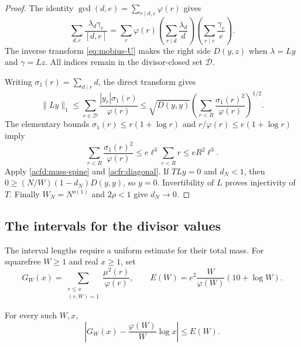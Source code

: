 \begin{proof}
The identity $\gcd(d,e)=\sum_{r\mid d,e}\varphi(r)$ gives
\[
 \sum_{d,e}\frac{\lambda_d\gamma_e}{[d,e]}
 =\sum_r\varphi(r)
       \left(\sum_{r\mid d}\frac{\lambda_d}{d}\right)
       \left(\sum_{r\mid e}\frac{\gamma_e}{e}\right).
\]
The inverse transform \eqref{eq:mobius-U} makes the right side $D(y,z)$
when $\lambda=Ly$ and $\gamma=Lz$.
All indices remain in the divisor-closed set $\mathcal D$.

Writing $\sigma_1(r)=\sum_{d\mid r}d$, the direct transform gives
\[
 \|Ly\|_1\leq\sum_{r\in\mathcal D}
       \frac{|y_r|\sigma_1(r)}{\varphi(r)}
 \leq\sqrt{D(y,y)}
       \left(\sum_{r<R}\frac{\sigma_1(r)^2}{\varphi(r)}\right)^{1/2}.
\]
The elementary bounds
$\sigma_1(r)\leq r(1+\log r)$ and
$r/\varphi(r)\leq e(1+\log r)$ imply
\[
 \sum_{r<R}\frac{\sigma_1(r)^2}{\varphi(r)}
       \leq e\ell^3\sum_{r<R}r\leq eR^2\ell^3.
\]
Apply \eqref{acfd:mass-spine} and \eqref{acfr:diagonal}.
If $TLy=0$ and $d_N<1$, then
$0\geq (N/W)(1-d_N)D(y,y)$, so $y=0$.
Invertibility of $L$ proves injectivity of $T$.
Finally $W_N=N^{o(1)}$ and $2\rho<1$ give $d_N\to0$.
\end{proof}

\subsection{The intervals for the divisor values}

The interval lengths require a uniform estimate for their total mass.
For squarefree $W\geq1$ and real $x\geq1$, set
\[
 G_W(x)=\sum_{\substack{r\leq x\\(r,W)=1}}
               \frac{\mu^2(r)}{\varphi(r)},\qquad
 E(W)=e^2\frac W{\varphi(W)}(10+\log W).
\]

\begin{lemma}\label{acfr:harmonic}
For every such $W,x$,
\begin{equation}\label{acfr:harmonic-bound}
 \left|G_W(x)-\frac{\varphi(W)}W\log x\right|\leq E(W).
\end{equation}
\end{lemma}

